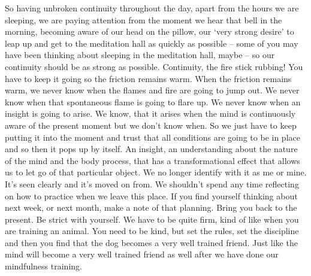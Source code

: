 \documentclass[letterpaper,10pt,english]{sphinxmanual}
\begin{document}
\sphinxAtStartPar
So  having  unbroken  continuity  throughout  the  day,  apart  from  the
hours  we  are  sleeping,  we  are  paying  attention  from  the  moment  we  hear
that  bell  in  the  morning,  becoming  aware  of  our  head  on  the  pillow,  our
‘very strong desire’ to leap up and get to the meditation hall as quickly as
possible – some of you may have been thinking about sleeping in the meditation hall, maybe – so our continuity should be as strong as possible.
Continuity, the fire stick
rubbing! You have to keep it going so the friction remains warm. When the
friction remains warm, we never know when the flames and fire are going
to jump out. We never know when that spontaneous flame is going to flare
up. We never know when an insight is going to arise. We know, that it arises
when the mind is continuously aware of the present moment but we don’t
know when. So we just have to keep putting it into the moment and trust that
all conditions are going to be in place and so then it pops up by itself. An
  insight, an understanding about the nature of the mind and the body process,
that has a transformational effect that allows us to let go of that particular
object. We no longer identify with it as me or mine. It’s seen clearly and it’s
moved on from. We shouldn’t spend any time reflecting on how to practice
when we leave this place. If you find yourself thinking about next week, or
next  month,  make  a  note  of  that  planning.  Bring  you  back  to  the  present.
Be strict with yourself. We have to be quite firm, kind of like when you are
training an animal. You need to be kind, but set the rules, set the discipline
and then you find that the dog becomes a very well trained friend. Just like
the mind will become a very well trained friend as well after we have done
our mindfulness training.
\end{document}
